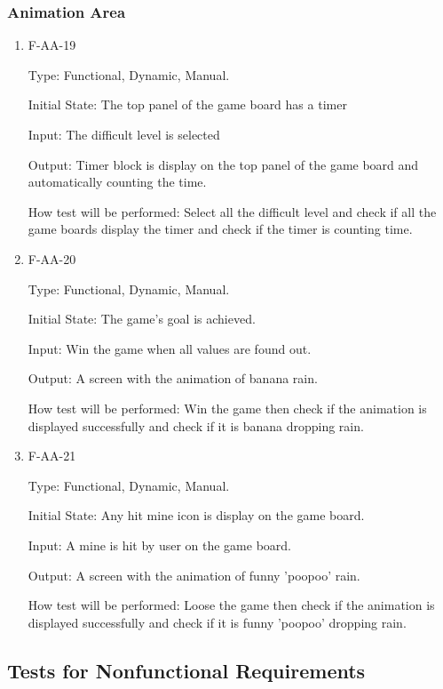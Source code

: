 \documentclass[12pt, titlepage]{article}
\begin{document}
\subsubsection{Animation Area}
\begin{enumerate}

\item{F-AA-19\\}

Type: Functional, Dynamic, Manual.
					
Initial State: The top panel of the game board has a timer
					
Input: The difficult level is selected
					
Output: Timer block is display on the top panel of the game board and automatically counting the time.
					
How test will be performed: Select all the difficult level and check if all the game boards display the timer and check if the timer is counting time.

\item{F-AA-20\\}

Type: Functional, Dynamic, Manual.
					
Initial State: The game's goal is achieved.
					
Input: Win the game when all values are found out.
					
Output: A screen with the animation of banana rain.
					
How test will be performed: Win the game then check if the animation is displayed successfully and check if it is banana dropping rain.

\item{F-AA-21\\}

Type: Functional, Dynamic, Manual.
					
Initial State: Any hit mine icon is display on the game board.
					
Input: A mine is hit by user on the game board.
					
Output: A screen with the animation of funny 'poopoo' rain.
					
How test will be performed: Loose the game then check if the animation is displayed successfully and check if it is funny 'poopoo' dropping rain.

\end{enumerate}
\subsection{Tests for Nonfunctional Requirements}
\end{document}
